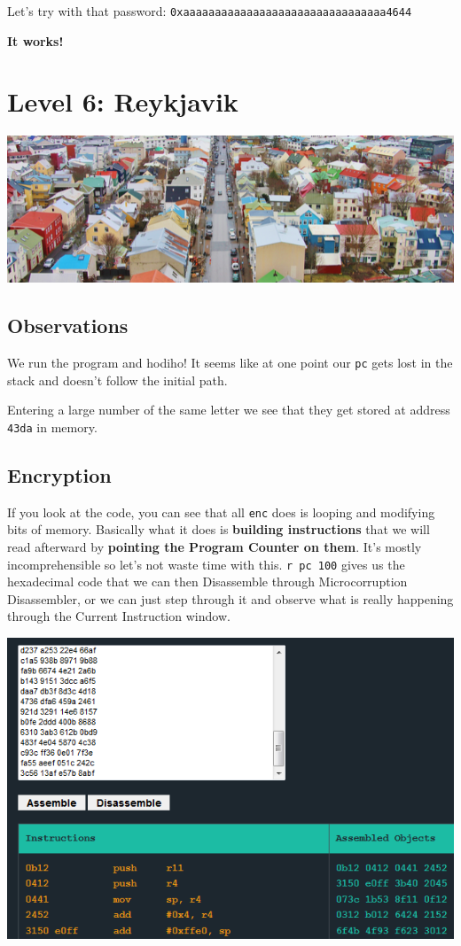 \documentclass[a4paper,11pt]{article}
\begin{document}
Let's try with that password:
\texttt{0xaaaaaaaaaaaaaaaaaaaaaaaaaaaaaaaa4644}

\textbf{It works!}

\section{Level 6: Reykjavik}\label{level-6-reykjavik}

\includegraphics{img/6_1.PNG}

\subsection{Observations}\label{observations-2}

We run the program and hodiho! It seems like at one point our
\texttt{pc} gets lost in the stack and doesn't follow the initial path.

Entering a large number of the same letter we see that they get stored
at address \texttt{43da} in memory.

\subsection{Encryption}\label{encryption}

If you look at the code, you can see that all \texttt{enc} does is
looping and modifying bits of memory. Basically what it does is
\textbf{building instructions} that we will read afterward by
\textbf{pointing the Program Counter on them}. It's mostly
incomprehensible so let's not waste time with this. \texttt{r pc 100}
gives us the hexadecimal code that we can then Disassemble through
Microcorruption Disassembler, or we can just step through it and observe
what is really happening through the Current Instruction window.

\includegraphics{img/6_3.PNG}
\end{document}
